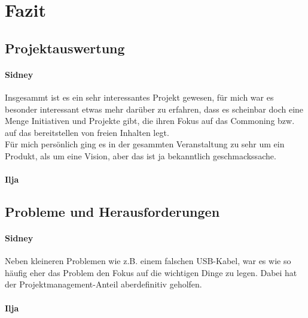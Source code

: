 
\chapter{Fazit} \label{Fazit}

\section{Projektauswertung} \label{Projektauswertung}

\subsubsection{Sidney}
Insgesammt ist es ein sehr interessantes Projekt gewesen, für mich war es besonder interessant etwas mehr darüber zu erfahren, dass es scheinbar doch eine Menge Initiativen und Projekte gibt, die ihren Fokus auf das Commoning bzw. auf das bereitstellen von freien Inhalten legt.\\
Für mich persönlich ging es in der gesammten Veranstaltung zu sehr um ein Produkt, als um eine Vision, aber das ist ja bekanntlich geschmackssache.\\

\subsubsection{Ilja}





\section{Probleme und Herausforderungen} \label{Probleme und Herausforderungen}

\subsubsection{Sidney}
Neben kleineren Problemen wie z.B. einem falschen USB-Kabel, war es wie so häufig eher das Problem den Fokus auf die wichtigen Dinge zu legen. Dabei hat der Projektmanagement-Anteil  aberdefinitiv geholfen.

\subsubsection{Ilja}






